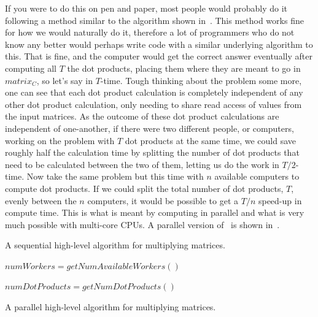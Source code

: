 \documentclass[a4paper,11pt]{article}
\begin{document}
If you were to do this on pen and paper, most people would probably do it following a method similar to the algorithm
shown in~. This method works fine for how we would naturally do it, therefore a lot of
programmers who do not know any better would perhaps write code with a similar underlying algorithm to this. That is fine,
and the computer would get the correct answer eventually after computing all $T$ the dot products, placing them where they
are meant to go in $matrix_C$, so let's say in $T$-time. Tough thinking about the problem some more, one can see that each dot product calculation
is completely independent of any other dot product calculation, only needing to share read access of values from the input
matrices. As the outcome of these dot product calculations are independent of one-another, if there were two different people,
or computers, working on the problem with $T$ dot products at the same time, we could save roughly half the calculation time by splitting the
number of dot products that need to be calculated between the two of them, letting us do the work in $T/2$-time. Now take the same problem but this time with
$n$ available computers to compute dot products. If we could split the total number of dot products, $T$, evenly between
the $n$ computers, it would be possible to get a $T/n$ speed-up in compute time. This is what is meant by computing in
parallel and what is very much possible with multi-core CPUs. A parallel version of~ is
shown in~.

\begin{algorithm}

  \BlankLine
\caption{A sequential high-level algorithm for multiplying matrices.}
\label{algo:matrix_mult_seq}
\end{algorithm}

\begin{algorithm}

  \BlankLine
  $numWorkers = getNumAvailableWorkers()$

  $numDotProducts = getNumDotProducts()$

  \BlankLine

  \BlankLine
  \BlankLine
\caption{A parallel high-level algorithm for multiplying matrices.}
\label{algo:matrix_mult_para}
\end{algorithm}
\end{document}

